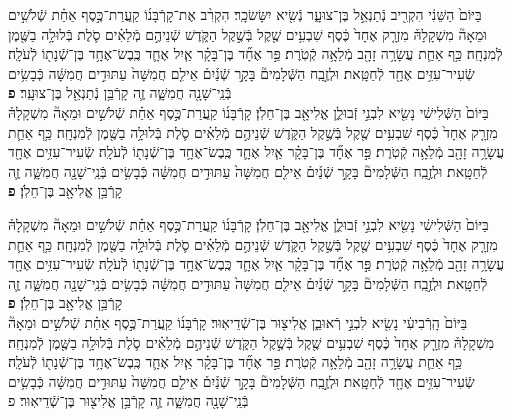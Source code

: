 \documentclass[twoside, openany, parskip=half, 11pt]{book}
\begin{document}
\begin{sometimes}
\begin{footnotesize}
\begin{multicols}{2}

בַּיּוֹם֙ הַשֵּׁנִ֔י הִקְרִ֖יב נְֿתַנְאֵ֣ל בֶּן־צוּעָ֑ר נְֿשִׂ֖יא יִשָּׂשׂכָֽר׃ הִקְרִ֨ב אֶת־קָרְֿבָּנ֜וֹ קַֽעֲרַת־כֶּ֣סֶף אַחַ֗ת שְֿׁלֹשִׁ֣ים וּמֵאָה֘ מִשְׁקָלָהּ֒ מִזְרָ֤ק אֶחָד֙ כֶּ֔סֶף שִׁבְעִ֥ים שֶׁ֖קֶל בְּֿשֶׁ֣קֶל הַקֹּ֑דֶשׁ שְֿׁנֵיהֶ֣ם מְֿלֵאִ֗ים סֹ֛לֶת בְּֿלוּלָ֥ה בַשֶּׁ֖מֶן לְֿמִנְחָֽה׃ כַּ֥ף אַחַ֛ת עֲשָׂרָ֥ה זָהָ֖ב מְֿלֵאָ֥ה קְֿטֹֽרֶת׃  פַּ֣ר אֶחָ֞ד בֶּן־בָּקָ֗ר אַ֧יִל אֶחָ֛ד כֶּֽבֶשׂ־אֶחָ֥ד בֶּן־שְֿׁנָת֖וֹ לְֿעֹלָֽה׃ שְֿׂעִיר־עִזִּ֥ים אֶחָ֖ד לְֿחַטָּֽאת׃ וּלְזֶ֣בַֽח הַשְּֿׁלָמִים֘ בָּקָ֣ר שְֿׁנַ֒יִם֒ אֵילִ֤ם חֲמִשָּׁה֙ עַתּוּדִ֣ים חֲמִשָּׁ֔ה כְּֿבָשִׂ֥ים בְּֿנֵֽי־שָׁנָ֖ה חֲמִשָּׁ֑ה זֶ֛ה קָרְֿבַּ֥ן נְֿתַנְאֵ֖ל בֶּן־צוּעָֽר׃ \textbf{פ} \\
בַּיּוֹם֙ הַשְּֿׁלִישִׁ֔י נָשִׂ֖יא לִבְנֵ֣י זְֿבוּלֻ֑ן אֱלִיאָ֖ב בֶּן־חֵלֹֽן׃ קָרְֿבָּנ֜וֹ קַֽעֲרַת־כֶּ֣סֶף אַחַ֗ת שְֿׁלֹשִׁ֣ים וּמֵאָה֘ מִשְׁקָלָהּ֒ מִזְרָ֤ק אֶחָד֙ כֶּ֔סֶף שִׁבְעִ֥ים שֶׁ֖קֶל בְּֿשֶׁ֣קֶל הַקֹּ֑דֶשׁ שְֿׁנֵיהֶ֣ם מְֿלֵאִ֗ים סֹ֛לֶת בְּֿלוּלָ֥ה בַשֶּׁ֖מֶן לְֿמִנְחָֽה׃ כַּ֥ף אַחַ֛ת עֲשָׂרָ֥ה זָהָ֖ב מְֿלֵאָ֥ה קְֿטֹֽרֶת׃ פַּ֣ר אֶחָ֞ד בֶּן־בָּקָ֗ר אַ֧יִל אֶחָ֛ד כֶּֽבֶשׂ־אֶחָ֥ד בֶּן־שְֿׁנָת֖וֹ לְֿעֹלָֽה׃ שְֿׂעִיר־עִזִּ֥ים אֶחָ֖ד לְֿחַטָּֽאת׃ וּלְזֶ֣בַֽח הַשְּֿׁלָמִים֘ בָּקָ֣ר שְֿׁנַ֒יִם֒ אֵילִ֤ם חֲמִשָּׁה֙ עַתּוּדִ֣ים חֲמִשָּׁ֔ה כְּֿבָשִׂ֥ים בְּֿנֵֽי־שָׁנָ֖ה חֲמִשָּׁ֑ה זֶ֛ה קָרְֿבַּ֥ן אֱלִיאָ֖ב בֶּן־חֵלֹֽן׃ \textbf{פ}


בַּיּוֹם֙ הַשְּֿׁלִישִׁ֔י נָשִׂ֖יא לִבְנֵ֣י זְֿבוּלֻ֑ן אֱלִיאָ֖ב בֶּן־חֵלֹֽן׃ קָרְֿבָּנ֜וֹ קַֽעֲרַת־כֶּ֣סֶף אַחַ֗ת שְֿׁלֹשִׁ֣ים וּמֵאָה֘ מִשְׁקָלָהּ֒ מִזְרָ֤ק אֶחָד֙ כֶּ֔סֶף שִׁבְעִ֥ים שֶׁ֖קֶל בְּֿשֶׁ֣קֶל הַקֹּ֑דֶשׁ שְֿׁנֵיהֶ֣ם מְֿלֵאִ֗ים סֹ֛לֶת בְּֿלוּלָ֥ה בַשֶּׁ֖מֶן לְֿמִנְחָֽה׃ כַּ֥ף אַחַ֛ת עֲשָׂרָ֥ה זָהָ֖ב מְֿלֵאָ֥ה קְֿטֹֽרֶת׃  פַּ֣ר אֶחָ֞ד בֶּן־בָּקָ֗ר אַ֧יִל אֶחָ֛ד כֶּֽבֶשׂ־אֶחָ֥ד בֶּן־שְֿׁנָת֖וֹ לְֿעֹלָֽה׃ שְֿׂעִיר־עִזִּ֥ים אֶחָ֖ד לְֿחַטָּֽאת׃ וּלְזֶ֣בַֽח הַשְּֿׁלָמִים֘ בָּקָ֣ר שְֿׁנַ֒יִם֒ אֵילִ֤ם חֲמִשָּׁה֙ עַתּוּדִ֣ים חֲמִשָּׁ֔ה כְּֿבָשִׂ֥ים בְּֿנֵֽי־שָׁנָ֖ה חֲמִשָּׁ֑ה זֶ֛ה קָרְֿבַּ֥ן אֱלִיאָ֖ב בֶּן־חֵלֹֽן׃ \textbf{פ} \\
 בַּיּוֹם֙ הָֽרְֿבִיעִ֔י נָשִׂ֖יא לִבְנֵ֣י רְֿאוּבֵ֑ן אֱלִיצ֖וּר בֶּן־שְֿׁדֵיאֽוּר׃ קָרְֿבָּנ֜וֹ קַֽעֲרַת־כֶּ֣סֶף אַחַ֗ת שְֿׁלֹשִׁ֣ים וּמֵאָה֘ מִשְׁקָלָהּ֒ מִזְרָ֤ק אֶחָד֙ כֶּ֔סֶף שִׁבְעִ֥ים שֶׁ֖קֶל בְּֿשֶׁ֣קֶל הַקֹּ֑דֶשׁ שְֿׁנֵיהֶ֣ם מְֿלֵאִ֗ים סֹ֛לֶת בְּֿלוּלָ֥ה בַשֶּׁ֖מֶן לְֿמִנְחָֽה׃ כַּ֥ף אַחַ֛ת עֲשָׂרָ֥ה זָהָ֖ב מְֿלֵאָ֥ה קְֿטֹֽרֶת׃ פַּ֣ר אֶחָ֞ד בֶּן־בָּקָ֗ר אַ֧יִל אֶחָ֛ד כֶּֽבֶשׂ־אֶחָ֥ד בֶּן־שְֿׁנָת֖וֹ לְֿעֹלָֽה׃ שְֿׂעִיר־עִזִּ֥ים אֶחָ֖ד לְֿחַטָּֽאת׃ וּלְזֶ֣בַֽח הַשְּֿׁלָמִים֘ בָּקָ֣ר שְֿׁנַ֒יִם֒ אֵילִ֤ם חֲמִשָּׁה֙ עַתּוּדִ֣ים חֲמִשָּׁ֔ה כְּֿבָשִׂ֥ים בְּֿנֵֽי־שָׁנָ֖ה חֲמִשָּׁ֑ה זֶ֛ה קָרְֿבַּ֥ן אֱלִיצ֖וּר בֶּן־שְֿׁדֵיאֽוּר׃ פ


\end{multicols}
\end{footnotesize}
\end{sometimes}
\end{document}
